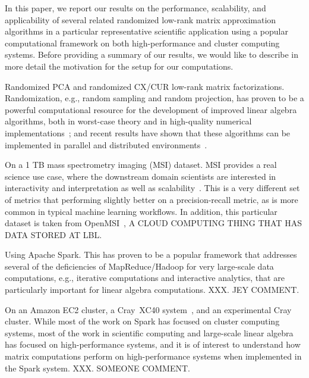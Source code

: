 In this paper, we report our results on the performance, scalability, and applicability of several related randomized low-rank matrix approximation algorithms in a particular representative scientific application using a popular computational framework on both high-performance and cluster computing systems.
Before providing a summary of our results, we would like to describe in more detail the motivation for the setup for our computations.
\begin{compactitem}
\item
Randomized PCA and randomized CX/CUR low-rank matrix factorizations. 
Randomization, e.g., random sampling and random projection, has proven to be a powerful computational resource for the development of improved linear algebra algorithms, both in worst-case theory and in high-quality numerical implementations~\cite{Mah-mat-rev_BOOK}; and recent results have shown that these algorithms can be implemented in parallel and distributed environments~\cite{YMM15_TR}.
\item
On a 1 TB mass spectrometry imaging (MSI) dataset.
MSI provides a real science use case, where the downstream domain scientists are interested in interactivity and interpretation as well as scalability~\cite{YRPMB15}.
This is a very different set of metrics that performing slightly better on a precision-recall metric, as is more common in typical machine learning workflows.
In addition, this particular dataset is taken from OpenMSI~\cite{OpenMIS13}, A CLOUD COMPUTING THING THAT HAS DATA STORED AT LBL.
\item
Using Apache Spark. 
This has proven to be a popular framework that addresses several of the deficiencies of MapReduce/Hadoop for very large-scale data computations, e.g., iterative computations and interactive analytics, that are particularly important for linear algebra computations.
XXX.  JEY COMMENT.
\item
On an Amazon EC2 cluster, a Cray{\textsuperscript{\tiny\textregistered}}~XC40{\textsuperscript{\tiny\texttrademark}}
system~\cite{alverson2012cray,craycascadesc12}, and an experimental Cray cluster.  
While most of the work on Spark has focused on cluster computing systems, most of the work in scientific computing and large-scale linear algebra has focused on high-performance systems, and it is of interest to understand how matrix computations perform on high-performance systems when implemented in the Spark system.
XXX.  SOMEONE COMMENT.
\end{compactitem}

